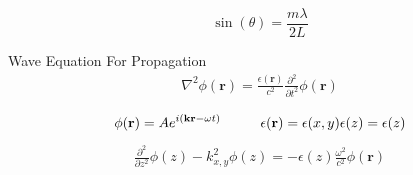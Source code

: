 \begin{frame}
  \begin{equation*}
    \sin(\theta) = \frac{m\lambda}{2L}
  \end{equation*}
  \vfill
  \begin{figure}
    \centering
    \resizebox{\textwidth}{!}{
      
    }
  \end{figure}
\end{frame}


\begin{frame}{Wave Equation For Propagation}
	\vspace{-0.25cm}
	\begin{equation*}
		\begin{split}
			\nabla^2 \phi(\mathbf{r}) = \frac{\epsilon(\mathbf{r})}{c^2} \frac{\partial^2}{\partial t^2}\phi(\mathbf{r})\\
		\end{split}
	\end{equation*}
	\vspace{0.25cm}
	\begin{equation*}
		\phi(\mathbf{r}) = A e^{ i \left( \mathbf{k}\mathbf{r} - \omega t \right) } \hspace*{1cm} \epsilon(\mathbf{r}) =  \epsilon(x,y) \epsilon(z) = \epsilon(z)
	\end{equation*}
	\vspace{0.25cm}
	\begin{equation*}
		\begin{split}
			 \frac{\partial^2}{\partial z^2} \phi(z) - k_{x,y}^2\phi(z) = -\epsilon(z)\frac{\omega^2}{c^2} \phi(\mathbf{r})\\
		\end{split}
	\end{equation*}
\end{frame}
